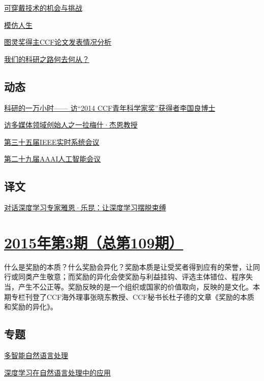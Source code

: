 \documentclass[a4paper]{article}
\begin{document}
\href{http://history.ccf.org.cn/resources/1190201776262/2015/04/13/7.pdf}{可穿戴技术的机会与挑战}

\href{http://history.ccf.org.cn/resources/1190201776262/2015/04/13/11.pdf}{模仿人生}

\href{http://history.ccf.org.cn/resources/1190201776262/2015/04/13/8.pdf}{图灵奖得主CCF论文发表情况分析}

\href{http://history.ccf.org.cn/resources/1190201776262/2015/04/13/9.pdf}{我们的科研之路何去何从？}

\subsection{动态}
\href{http://history.ccf.org.cn/resources/1190201776262/2015/04/13/12.pdf}{科研的一万小时—— 访“2014 CCF青年科学家奖”获得者李国良博士}

\href{http://history.ccf.org.cn/resources/1190201776262/2015/04/13/13.pdf}{访多媒体领域创始人之一拉梅什·杰恩教授}

\href{http://history.ccf.org.cn/resources/1190201776262/2015/04/13/14.pdf}{第三十五届IEEE实时系统会议}

\href{http://history.ccf.org.cn/resources/1190201776262/2015/04/13/15.pdf}{第二十九届AAAI人工智能会议}

\subsection{译文}
\href{http://history.ccf.org.cn/resources/1190201776262/2015/04/13/16.pdf}{对话深度学习专家雅恩·乐昆：让深度学习摆脱束缚}


\section{\href{http://history.ccf.org.cn/sites/ccf/jsjtbbd.jsp?contentId=2851766225495}{\textbf{2015年第3期（总第109期）}}}
什么是奖励的本质？什么奖励会异化？奖励本质是让受奖者得到应有的荣誉，让同行或同类产生敬意；而奖励的异化会使奖励与利益挂钩、评选主体错位、程序失当，产生不公正等。奖励反映的是一个组织或国家的价值取向，反映的是文化。本期专栏刊登了CCF海外理事张晓东教授、CCF秘书长杜子德的文章《奖励的本质和奖励的异化》。
\subsection{专题}
\href{http://history.ccf.org.cn/resources/1190201776262/2015/03/12/1.pdf}{多智能自然语言处理}

\href{http://history.ccf.org.cn/resources/1190201776262/2015/03/12/2.pdf}{深度学习在自然语言处理中的应用}
\end{document}
